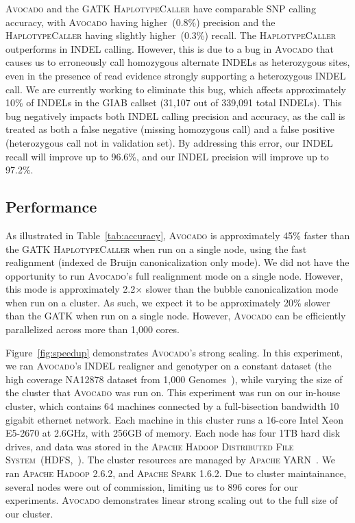 \documentclass{bioinfo}
\begin{document}
\textsc{Avocado} and the \textsc{GATK HaplotypeCaller} have comparable SNP
calling accuracy, with \textsc{Avocado} having higher~(0.8\%) precision
and the \textsc{HaplotypeCaller} having slightly higher~(0.3\%) recall.
The \textsc{HaplotypeCaller} outperforms in INDEL calling. However, this
is due to a bug in \textsc{Avocado} that causes us to erroneously call
homozygous alternate INDELs as heterozygous sites, even in the presence
of read evidence strongly supporting a heterozygous INDEL call. We are
currently working to eliminate this bug, which affects approximately
10\% of INDELs in the GIAB callset (31,107 out of 339,091 total INDELs).
This bug negatively impacts both INDEL calling precision and accuracy, as
the call is treated as both a false negative (missing homozygous call) and a
false positive (heterozygous call not in validation set). By addressing this
error, our INDEL recall will improve up to 96.6\%, and our INDEL precision
will improve up to 97.2\%.

\subsection{Performance}
\label{sec:performance}

As illustrated in Table~\ref{tab:accuracy}, \textsc{Avocado} is approximately
45\% faster than the \textsc{GATK HaplotypeCaller} when run on a single node,
using the fast realignment (indexed de Bruijn canonicalization only mode). We did not
have the opportunity to run \textsc{Avocado}'s full realignment mode on a
single node. However, this mode is approximately 2.2$\times$ slower than
the bubble canonicalization mode when run on a cluster. As such, we expect
it to be approximately 20\% slower than the \textsc{GATK} when run on a single
node. However, \textsc{Avocado} can be efficiently parallelized across more
than 1,000 cores.

Figure~\ref{fig:speedup} demonstrates \textsc{Avocado}'s strong scaling. In
this experiment, we ran \textsc{Avocado}'s INDEL realigner and genotyper on a
constant dataset (the high coverage NA12878 dataset from 1,000
Genomes~\citep{1kg}), while varying the size of the cluster that \textsc{Avocado}
was run on. This experiment was run on our in-house cluster, which contains
64 machines connected by a full-bisection bandwidth 10 gigabit ethernet
network. Each machine in this cluster runs a 16-core Intel Xeon E5-2670 at
2.6GHz, with 256GB of memory. Each node has four 1TB hard disk
drives, and data was stored in the \textsc{Apache Hadoop Distributed File
System}~(HDFS,~\citep{shvachko10}). The cluster resources are managed by \textsc{Apache
YARN}~\citep{vavilapalli13}. We ran \textsc{Apache Hadoop} 2.6.2, and \textsc{Apache
Spark} 1.6.2. Due to cluster maintainance, several nodes were out of commission,
limiting us to 896 cores for our experiments.
\textsc{Avocado} demonstrates linear strong scaling out to the full size of our
cluster.
\end{document}
